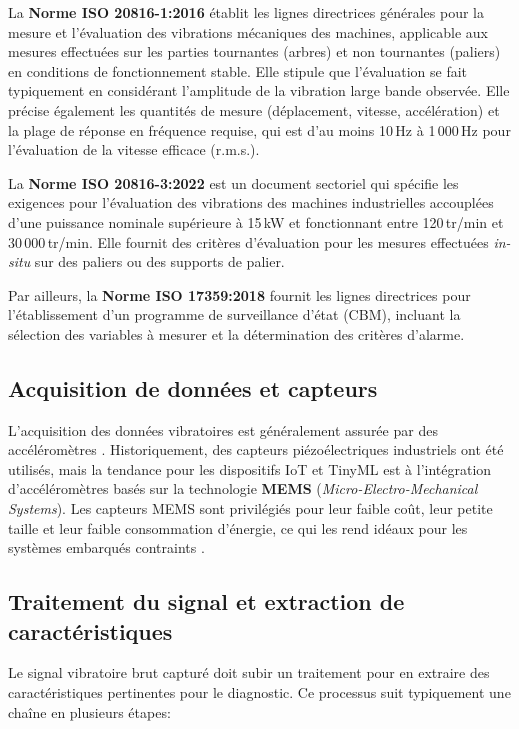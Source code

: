 La \textbf{Norme ISO 20816-1:2016} \cite{iso20816-1} établit les lignes directrices générales pour la mesure et l'évaluation des vibrations mécaniques des machines, applicable aux mesures effectuées sur les parties tournantes (arbres) et non tournantes (paliers) en conditions de fonctionnement stable. Elle stipule que l'évaluation se fait typiquement en considérant l'amplitude de la vibration large bande observée. Elle précise également les quantités de mesure (déplacement, vitesse, accélération) et la plage de réponse en fréquence requise, qui est d'au moins 10\,Hz à 1\,000\,Hz pour l'évaluation de la vitesse efficace (r.m.s.).

La \textbf{Norme ISO 20816-3:2022} \cite{iso20816-3} est un document sectoriel qui spécifie les exigences pour l'évaluation des vibrations des machines industrielles accouplées d'une puissance nominale supérieure à 15\,kW et fonctionnant entre 120\,tr/min et 30\,000\,tr/min. Elle fournit des critères d'évaluation pour les mesures effectuées \textit{in-situ} sur des paliers ou des supports de palier.

Par ailleurs, la \textbf{Norme ISO 17359:2018} \cite{iso17359} fournit les lignes directrices pour l'établissement d'un programme de surveillance d'état (CBM), incluant la sélection des variables à mesurer et la détermination des critères d'alarme.

\subsection{Acquisition de données et capteurs}

L'acquisition des données vibratoires est généralement assurée par des accéléromètres \cite{hassan2024}. Historiquement, des capteurs piézoélectriques industriels ont été utilisés, mais la tendance pour les dispositifs IoT et TinyML est à l'intégration d'accéléromètres basés sur la technologie \textbf{MEMS} (\textit{Micro-Electro-Mechanical Systems}). Les capteurs MEMS sont privilégiés pour leur faible coût, leur petite taille et leur faible consommation d'énergie, ce qui les rend idéaux pour les systèmes embarqués contraints \cite{hassan2024,arciniegas2025}.

\subsection{Traitement du signal et extraction de caractéristiques}

Le signal vibratoire brut capturé doit subir un traitement pour en extraire des caractéristiques pertinentes pour le diagnostic. Ce processus suit typiquement une chaîne en plusieurs étapes:

